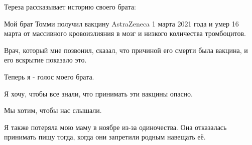 Тереза рассказывает историю своего брата:

Мой брат Томми получил вакцину AstraZeneca 1 марта 2021 года и умер 16 марта от
массивного кровоизлияния в мозг и низкого количества тромбоцитов.

Врач, который мне позвонил, сказал, что причиной его смерти была вакцина, и его
вскрытие показало это.

Теперь я - голос моего брата.

Я хочу, чтобы все знали, что принимать эти вакцины опасно.

Мы хотим, чтобы нас слышали.

Я также потеряла мою маму в ноябре из-за одиночества. Она отказалась принимать
пищу тогда, когда они запретили родным навещать её.
